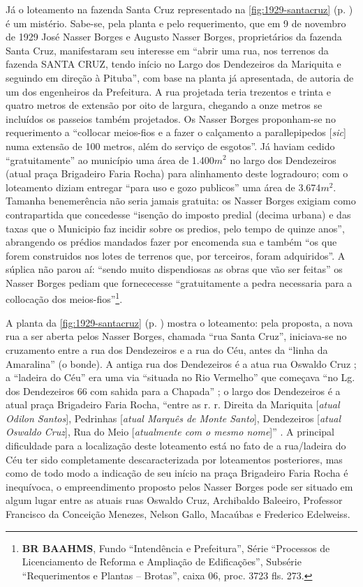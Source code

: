 Já o loteamento na fazenda Santa Cruz representado na \autoref{fig:1929-santacruz} (p. \pageref{fig:1929-santacruz}) é um mistério. Sabe-se, pela planta e pelo requerimento, que em 9 de novembro de 1929 José Nasser Borges e Augusto Nasser Borges, proprietários da fazenda Santa Cruz, manifestaram seu interesse em ``abrir uma rua, nos terrenos da fazenda SANTA CRUZ, tendo início no Largo dos Dendezeiros da Mariquita e seguindo em direção à Pituba'', com base na planta já apresentada, de autoria de um dos engenheiros da Prefeitura. A rua projetada teria trezentos e trinta e quatro metros de extensão por oito de largura, chegando a onze metros se incluídos os passeios também projetados. Os Nasser Borges proponham-se no requerimento a ``collocar meios-fios e a fazer o calçamento a parallepipedos [\textit{sic}] numa extensão de 100 metros, além do serviço de esgotos''. Já haviam cedido ``gratuitamente'' ao município uma área de 1.400$m^{2}$ no largo dos Dendezeiros (atual praça Brigadeiro Faria Rocha) para alinhamento deste logradouro; com o loteamento diziam entregar ``para uso e gozo publicos'' uma área de 3.674$m^{2}$. Tamanha benemerência não seria jamais gratuita: os Nasser Borges exigiam como contrapartida que concedesse ``isenção do imposto predial (decima urbana) e das taxas que o Municipio faz incidir sobre os predios, pelo tempo de quinze anos'', abrangendo os prédios mandados fazer por encomenda sua e também ``os que forem construidos nos lotes de terrenos que, por terceiros, foram adquiridos''. A súplica não parou aí: ``sendo muito dispendiosas as obras que vão ser feitas'' os Nasser Borges pediam que fornececesse ``gratuitamente a pedra necessaria para a collocação dos meios-fios''\footnote{\textbf{BR BAAHMS}, Fundo ``Intendência e Prefeitura'', Série ``Processos de Licenciamento de Reforma e Ampliação de Edificações'', Subsérie ``Requerimentos e Plantas -- Brotas'', caixa 06, proc. 3723 fls. 273.}.

A planta da \autoref{fig:1929-santacruz} (p. \pageref{fig:1929-santacruz}) mostra o loteamento: pela proposta, a nova rua a ser aberta pelos Nasser Borges, chamada ``rua Santa Cruz'', iniciava-se no cruzamento entre a rua dos Dendezeiros e a rua do Céu, antes da ``linha da Amaralina'' (o bonde). A antiga rua dos Dendezeiros é a atua rua Oswaldo Cruz \cite[p.~100]{souza_guia_1935}; a ``ladeira do Céu'' era uma via ``situada no Rio Vermelho'' que começava ``no Lg. dos Dendezeiros 66 com sahida para a Chapada'' \cite[p.~33]{souza_guia_1935}; o largo dos Dendezeiros é a atual praça Brigadeiro Faria Rocha, ``entre as r. r. Direita da Mariquita [\textit{atual Odilon Santos}], Pedrinhas [\textit{atual Marquês de Monte Santo}], Dendezeiros [\textit{atual Oswaldo Cruz}], Rua do Meio [\textit{atualmente com o mesmo nome}]'' \cite[p.~22]{souza_guia_1935}. A principal dificuldade para a localização deste loteamento está no fato de a rua/ladeira do Céu ter sido completamente descaracterizada por loteamentos posteriores, mas como de todo modo a indicação de seu início na praça Brigadeiro Faria Rocha é inequívoca, o empreendimento proposto pelos Nasser Borges pode ser situado em algum lugar entre as atuais ruas Oswaldo Cruz, Archibaldo Baleeiro, Professor Francisco da Conceição Menezes, Nelson Gallo, Macaúbas e Frederico Edelweiss.


